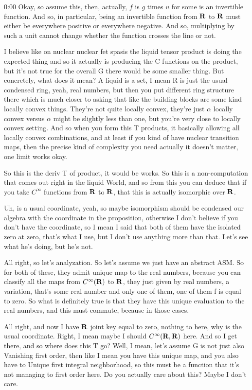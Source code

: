 \begin{unfinished}{0:00}
Okay, so assume this, then, actually, $f$ is $g$ times $u$ for some is an invertible function. And so, in particular, being an invertible function from $\mathbf R$ to $\mathbf R$ must either be everywhere positive or everywhere negative. And so, multiplying by such a unit cannot change whether the function crosses the line or not.

I believe like on nuclear nuclear fet spasis the liquid tensor product is doing the expected thing and so it actually is producing the C functions on the product, but it's not true for the overall G there would be some smaller thing. But concretely, what does it mean? A liquid is a set, I mean R is just the usual condensed ring, yeah, real numbers, but then you put different ring structure there which is much closer to asking that like the building blocks are some kind locally convex things. They're not quite locally convex, they're just $\alpha$ locally convex versus $\alpha$ might be slightly less than one, but you're very close to locally convex setting. And so when you form this T products, it basically allowing all locally convex combinations, and at least if you kind of have nuclear transition maps, then the precise kind of complexity you need actually it doesn't matter, one limit works okay.

So this is the deriv T of product, it would be works. So this is a non-computation that comes out right in the liquid World, and so from this you can deduce that if you take $C^\infty$ functions from $\mathbf R$ to $\mathbf R$, that this is actually isomorphic over $\mathbf R$. 

Uh, is a usual coordinate, yeah, so maybe isomorphism should be condensed our algebra with the coordinate in the proposition, otherwise I don't believe if you don't have the coordinate, so I mean I said that both of them have the isolated zero at zero, that's what I use, but I don't use anything more than that. Let's see what he's doing, but he's not.

All right, so let's analyzation. So let's assume we just have an abstract ASM. So for both of these, they admit unique map to the real numbers, because you can classify all the maps from $C^\infty(\mathbf R)$ to $\mathbf R$, they just given by real numbers, a variation, that's some real number and only one of them, one of them f is equal to zero. So what is definitely true is that they have this unique evaluation to the real numbers, and this must commute, because in those cases.

All right, and now I have $\mathbf R$ joint key equal to zero, nothing to here, why is the usual coordinate. Right, I mean maybe I should $C^\infty(\mathbf R, \mathbf R)$ here. And so I get there, and so where does this T go? Well, I mean, let's assume G is not just also Vanishing first order, then like I mean you have this unique map, and you also have to Unique first integral neighborhood, so this must be a function that it's not managing to first order here. Do you actually care about this? Maybe I don't care.


\end{unfinished}
